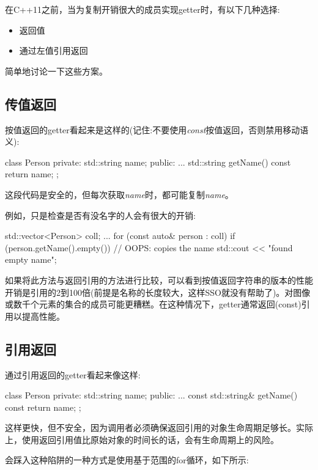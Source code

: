 在C++11之前，当为复制开销很大的成员实现getter时，有以下几种选择:

\begin{itemize}
	\item 返回值
	\item 通过左值引用返回
\end{itemize}

简单地讨论一下这些方案。

\subsection{传值返回}

按值返回的getter看起来是这样的(记住:不要使用\textit{const}按值返回，否则禁用移动语义):

\begin{cppcode}
class Person
{
private:
	std::string name;
public:
	...
	std::string getName() const {
		return name;
	}
};
\end{cppcode}

这段代码是安全的，但每次获取\textit{name}时，都可能复制\textit{name}。

例如，只是检查是否有没名字的人会有很大的开销:

\begin{cppcode}
std::vector<Person> coll;
...
for (const auto& person : coll) {
	if (person.getName().empty()) { // OOPS: copies the name
		std::cout << "found empty name\n";
	}
}
\end{cppcode}

如果将此方法与返回引用的方法进行比较，可以看到按值返回字符串的版本的性能开销是引用的2到100倍(前提是名称的长度较大，这样SSO就没有帮助了)。对图像或数千个元素的集合的成员可能更糟糕。在这种情况下，getter通常返回(const)引用以提高性能。

\subsection{引用返回}

通过引用返回的getter看起来像这样:

\begin{cppcode}
class Person
{
private:
	std::string name;
public:
	...
	const std::string& getName() const {
		return name;
	}
};
\end{cppcode}

这样更快，但不安全，因为调用者必须确保返回引用的对象生命周期足够长。实际上，使用返回引用值比原始对象的时间长的话，会有生命周期上的风险。

会踩入这种陷阱的一种方式是使用基于范围的for循环，如下所示:


